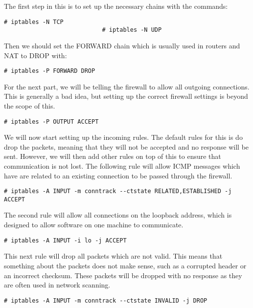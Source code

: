 						The first step in this is to set up the necessary chains with the commands:
						\begin{lstlisting}[style=CLI]
							# iptables -N TCP
							# iptables -N UDP
						\end{lstlisting}
						Then we should set the FORWARD chain which is usually used in routers and NAT to DROP with:
						\begin{lstlisting}[style=CLI]
							# iptables -P FORWARD DROP
						\end{lstlisting}
						For the next part, we will be telling the firewall to allow all outgoing connections.
						This is generally a bad idea, but setting up the correct firewall settings is beyond the scope of this.
						\begin{lstlisting}[style=CLI]
							# iptables -P OUTPUT ACCEPT
						\end{lstlisting}
						We will now start setting up the incoming rules.
						The default rules for this is do drop the packets, meaning that they will not be accepted and no response will be sent.
						However, we will then add other rules on top of this to ensure that communication is not lost.
						The following rule will allow ICMP messages which have are related to an existing connection to be passed through the firewall.
						\begin{lstlisting}[style=CLI]
							# iptables -A INPUT -m conntrack --ctstate RELATED,ESTABLISHED -j ACCEPT
						\end{lstlisting}
						The second rule will allow all connections on the loopback address, which is designed to allow software on one machine to communicate.
						\begin{lstlisting}[style=CLI]
							# iptables -A INPUT -i lo -j ACCEPT
						\end{lstlisting}
						This next rule will drop all packets which are not valid.
						This means that something about the packets does not make sense, such as a corrupted header or an incorrect checksum.
						These packets will be dropped with no response as they are often used in network scanning.
						\begin{lstlisting}[style=CLI]
							# iptables -A INPUT -m conntrack --ctstate INVALID -j DROP
						\end{lstlisting}

